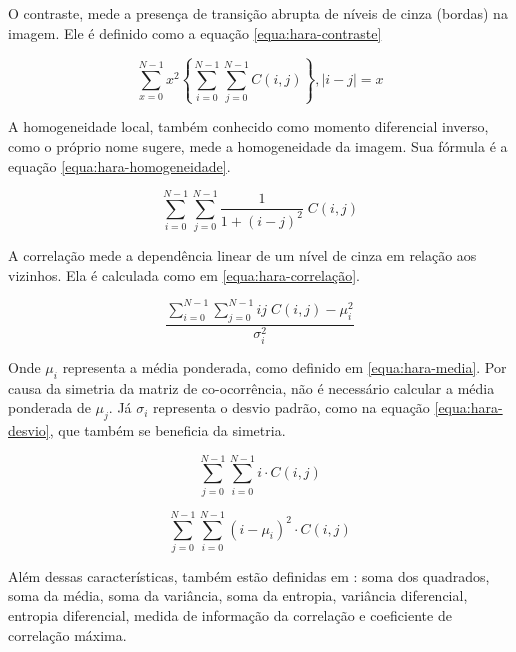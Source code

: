 O contraste, mede a presença de transição abrupta de níveis de cinza (bordas) na imagem. Ele é definido como a equação \ref{equa:hara-contraste}

\begin{equation}
 \sum_{x=0}^{N-1} x^2 \left\{\sum_{i=0}^{N-1}\sum_{j=0}^{N-1} C(i,j)\right\},|i - j| = x
 \label{equa:hara-contraste}
\end{equation}

A homogeneidade local, também conhecido como momento diferencial inverso, como o próprio nome sugere, mede a homogeneidade da imagem. Sua fórmula é a equação \ref{equa:hara-homogeneidade}.

\begin{equation}
 \sum_{i=0}^{N-1}\sum_{j=0}^{N-1} \frac{1}{1 + (i - j)^2} \;C(i,j)
 \label{equa:hara-homogeneidade}
\end{equation}

A correlação mede a dependência linear de um nível de cinza em relação aos vizinhos. Ela é calculada como em \ref{equa:hara-correlação}.

\begin{equation}
 \frac{\sum\limits_{i=0}^{N-1}\sum\limits_{j=0}^{N-1} i j\; C(i,j) - \mu_{i}^2}{\sigma_{i}^2}
 \label{equa:hara-correlação}
\end{equation}

Onde $\mu_{i}$ representa a média ponderada, como definido em \ref{equa:hara-media}. Por causa da simetria da matriz de co-ocorrência, não é necessário calcular a média ponderada de $\mu_{j}$. Já $\sigma_{i}$ representa o desvio padrão, como na equação \ref{equa:hara-desvio}, que também se beneficia da simetria.

\begin{equation}
 \sum_{j=0}^{N-1}\sum_{i=0}^{N-1} i \cdot C(i, j)
 \label{equa:hara-media}
\end{equation}

\begin{equation}
 \sum_{j=0}^{N-1}\sum_{i=0}^{N-1} (i - \mu_{i})^2 \cdot C(i, j)
 \label{equa:hara-desvio}
\end{equation}

Além dessas características, também estão definidas em \cite{Haralick}: soma dos quadrados, soma da média, soma da variância, soma da entropia, variância diferencial, entropia diferencial, medida de informação da correlação e coeficiente de correlação máxima.
